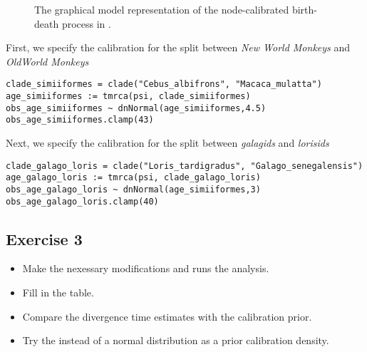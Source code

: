 \begin{figure}[h!]
\centering
{}
\caption{\small The graphical model representation of the node-calibrated birth-death process in \RevBayes.}
\label{m_BDCal:fig}
\end{figure}

First, we specify the calibration for the split between \emph{New World Monkeys} and \emph{OldWorld Monkeys}
{\tt \begin{snugshade*}
\begin{lstlisting}
clade_simiiformes = clade("Cebus_albifrons", "Macaca_mulatta")
age_simiiformes := tmrca(psi, clade_simiiformes)
obs_age_simiiformes ~ dnNormal(age_simiiformes,4.5)
obs_age_simiiformes.clamp(43)
\end{lstlisting}
\end{snugshade*}}
Next, we specify the calibration for the split between \emph{galagids} and \emph{lorisids}
{\tt \begin{snugshade*}
\begin{lstlisting}
clade_galago_loris = clade("Loris_tardigradus", "Galago_senegalensis")
age_galago_loris := tmrca(psi, clade_galago_loris)
obs_age_galago_loris ~ dnNormal(age_simiiformes,3)
obs_age_galago_loris.clamp(40)
\end{lstlisting}
\end{snugshade*}}


\subsection{Exercise 3}

\begin{itemize}
\item Make the nexessary modifications and runs the analysis.
\item Fill in the table.
\item Compare the divergence time estimates with the calibration prior.
\item Try the  instead of a normal distribution as a prior calibration density.
\end{itemize}




